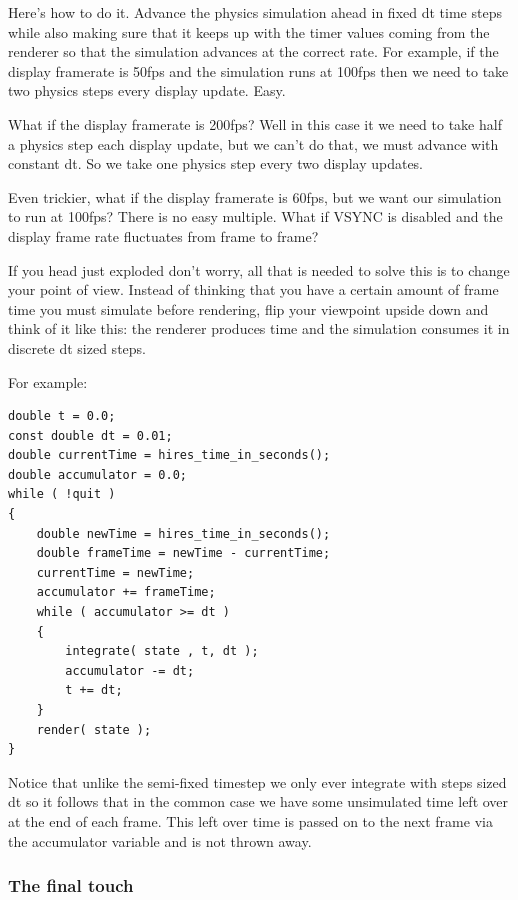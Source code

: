 \documentclass[12pt]{article}
\begin{document}
Here's how to do it. Advance the physics simulation ahead in fixed dt time steps while also making sure that it keeps up with the timer values coming from the renderer so that the simulation advances at the correct rate. For example, if the display framerate is 50fps and the simulation runs at 100fps then we need to take two physics steps every display update. Easy.

What if the display framerate is 200fps? Well in this case it we need to take half a physics step each display update, but we can't do that, we must advance with constant dt. So we take one physics step every two display updates. 

Even trickier, what if the display framerate is 60fps, but we want our simulation to run at 100fps? There is no easy multiple. What if VSYNC is disabled and the display frame rate fluctuates from frame to frame?

If you head just exploded don't worry, all that is needed to solve this is to change your point of view. Instead of thinking that you have a certain amount of frame time you must simulate before rendering, flip your viewpoint upside down and think of it like this: the renderer produces time and the simulation consumes it in discrete dt sized steps.

For example:

\begin{minipage}{\linewidth}\begin{lstlisting}
double t = 0.0;
const double dt = 0.01;
double currentTime = hires_time_in_seconds();
double accumulator = 0.0;
while ( !quit )
{
	double newTime = hires_time_in_seconds();
	double frameTime = newTime - currentTime;
	currentTime = newTime;
	accumulator += frameTime;
	while ( accumulator >= dt )
	{
		integrate( state , t, dt );
		accumulator -= dt;
		t += dt;
	}
	render( state );
}
\end{lstlisting}\end{minipage}

Notice that unlike the semi-fixed timestep we only ever integrate with steps sized dt so it follows that in the common case we have some unsimulated time left over at the end of each frame. This left over time is passed on to the next frame via the accumulator variable and is not thrown away.

\subsubsection*{The final touch}
\end{document}
